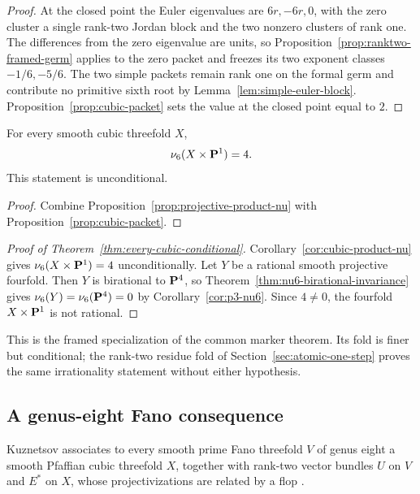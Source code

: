 \begin{proof}
At the closed point the Euler eigenvalues are $6r,-6r,0$, with the zero
cluster a single rank-two Jordan block and the two nonzero clusters of rank
one.  The differences from the zero eigenvalue are units, so
Proposition~\ref{prop:ranktwo-framed-germ} applies to the zero packet and
freezes its two exponent classes $-1/6,-5/6$.  The two simple packets remain
rank one on the formal germ and contribute no primitive sixth root by
Lemma~\ref{lem:simple-euler-block}.  Proposition~\ref{prop:cubic-packet}
sets the value at the closed point equal to $2$.
\end{proof}

\begin{corollary}
\label{cor:cubic-product-nu}
%
%
For every smooth cubic threefold $X$,
\[
 \nu_6(X\times\mathbf P^1)=4.
\]
This statement is unconditional.
\end{corollary}

\begin{proof}
Combine Proposition~\ref{prop:projective-product-nu} with
Proposition~\ref{prop:cubic-packet}.
\end{proof}

\begin{proof}[Proof of Theorem~\ref{thm:every-cubic-conditional}]
Corollary~\ref{cor:cubic-product-nu} gives \(\nu_6(X\times\mathbf P^1)=4\)
unconditionally.  Let \(Y\) be a rational smooth projective fourfold.  Then
\(Y\) is birational to \(\mathbf P^4\), so
Theorem~\ref{thm:nu6-birational-invariance} gives
\(\nu_6(Y)=\nu_6(\mathbf P^4)=0\) by Corollary~\ref{cor:p3-nu6}.
Since \(4\ne0\), the fourfold \(X\times\mathbf P^1\) is not rational.
\end{proof}

This is the framed specialization of the common marker theorem.  Its fold is
finer but conditional; the rank-two residue fold of
Section~\ref{sec:atomic-one-step} proves the same irrationality statement
without either hypothesis.

\subsection{A genus-eight Fano consequence}

Kuznetsov associates to every smooth prime Fano threefold \(V\) of genus
eight a smooth Pfaffian cubic threefold \(X\), together with rank-two vector
bundles \(U\) on \(V\) and \(E^*\) on \(X\), whose projectivizations are
related by a flop \cite[Theorems~2.17--2.18]{KuznetsovV14}.

